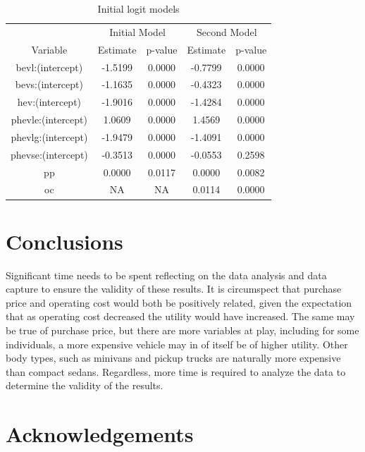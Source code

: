\documentclass[]{elsarticle} %
\begin{document}
\begin{table}[t]

\caption{\label{tab:sadmnl}Initial logit models}
\centering
\begin{tabular}{ccccc}
\toprule
\multicolumn{1}{c}{ } & \multicolumn{2}{c}{Initial Model} & \multicolumn{2}{c}{Second Model} \\
\cmidrule(l{3pt}r{3pt}){2-3} \cmidrule(l{3pt}r{3pt}){4-5}
Variable & Estimate & p-value & Estimate & p-value\\
\midrule
bevl:(intercept) & -1.5199 & 0.0000 & -0.7799 & 0.0000\\
bevs:(intercept) & -1.1635 & 0.0000 & -0.4323 & 0.0000\\
hev:(intercept) & -1.9016 & 0.0000 & -1.4284 & 0.0000\\
phevle:(intercept) & 1.0609 & 0.0000 & 1.4569 & 0.0000\\
phevlg:(intercept) & -1.9479 & 0.0000 & -1.4091 & 0.0000\\
\addlinespace
phevse:(intercept) & -0.3513 & 0.0000 & -0.0553 & 0.2598\\
pp & 0.0000 & 0.0117 & 0.0000 & 0.0082\\
oc & NA & NA & 0.0114 & 0.0000\\
\bottomrule
\end{tabular}
\end{table}

\section{Conclusions}\label{conclusions}

Significant time needs to be spent reflecting on the data analysis and
data capture to ensure the validity of these results. It is circumspect
that purchase price and operating cost would both be positively related,
given the expectation that as operating cost decreased the utility would
have increased. The same may be true of purchase price, but there are
more variables at play, including for some individuals, a more expensive
vehicle may in of itself be of higher utility. Other body types, such as
minivans and pickup trucks are naturally more expensive than compact
sedans. Regardless, more time is required to analyze the data to
determine the validity of the results.

\section{Acknowledgements}\label{acknowledgements}
\end{document}
